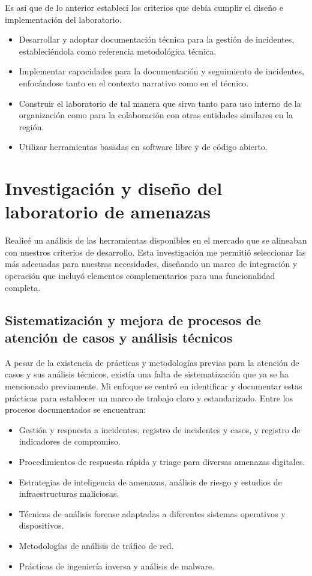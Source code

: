 \documentclass[12pt]{caltech_thesis}
\begin{document}
Es así que de lo anterior establecí los criterios que debía cumplir el diseño e implementación del laboratorio.

\begin{itemize}
    \item Desarrollar y adoptar documentación técnica para la gestión de incidentes, estableciéndola como referencia metodológica técnica.
    \item Implementar capacidades para la documentación y seguimiento de incidentes, enfocándose tanto en el contexto narrativo como en el técnico.
    \item Construir el laboratorio de tal manera que sirva tanto para uso interno de la organización como para la colaboración con otras entidades similares en la región.
    \item Utilizar herramientas basadas en software libre y de código abierto.
\end{itemize}

\section{Investigación y diseño del laboratorio de amenazas}

Realicé un análisis de las herramientas disponibles en el mercado que se alineaban con nuestros criterios de desarrollo. Esta investigación me permitió seleccionar las más adecuadas para nuestras necesidades, diseñando un marco de integración y operación que incluyó elementos complementarios para una funcionalidad completa.

\subsection{Sistematización y mejora de procesos de atención de casos y análisis técnicos}

A pesar de la existencia de prácticas y metodologías previas para la atención de casos y sus análisis técnicos, existía una falta de sistematización que ya se ha mencionado previamente. Mi enfoque se centró en identificar y documentar estas prácticas para establecer un marco de trabajo claro y estandarizado. Entre los procesos documentados se encuentran:

\begin{itemize}
    \item Gestión y respuesta a incidentes, registro de incidentes y casos, y registro de indicadores de compromiso.
    \item Procedimientos de respuesta rápida y triage para diversas amenazas digitales.
    \item Estrategias de inteligencia de amenazas, análisis de riesgo y estudios de infraestructuras maliciosas.
    \item Técnicas de análisis forense adaptadas a diferentes sistemas operativos y dispositivos.
    \item Metodologías de análisis de tráfico de red.
    \item Prácticas de ingeniería inversa y análisis de malware.
\end{itemize}
\end{document}
